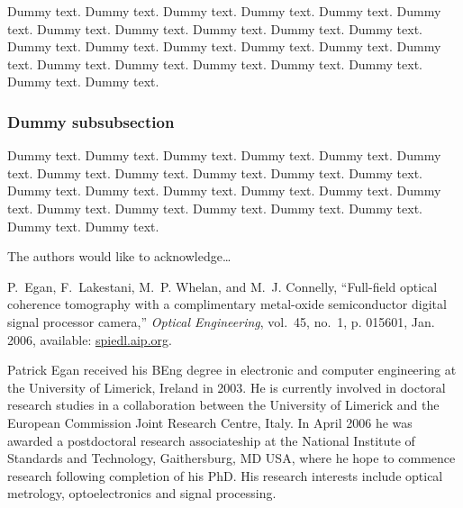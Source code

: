 \documentclass[10pt,letterpaper,optenglett,fleqn]{article}      %
\begin{document}
Dummy text. Dummy text. Dummy text. Dummy text. Dummy text. Dummy
text. Dummy text. Dummy text. Dummy text. Dummy text. Dummy text.
Dummy text. Dummy text. Dummy text. Dummy text. Dummy text. Dummy
text. Dummy text. Dummy text. Dummy text. Dummy text. Dummy text.
Dummy text. Dummy text.

\subsubsection{Dummy subsubsection}

Dummy text. Dummy text. Dummy text. Dummy text. Dummy text. Dummy
text. Dummy text. Dummy text. Dummy text. Dummy text. Dummy text.
Dummy text. Dummy text. Dummy text. Dummy text. Dummy text. Dummy
text. Dummy text. Dummy text. Dummy text. Dummy text. Dummy text.
Dummy text. Dummy text.





The authors would like to acknowledge\ldots



%
%

\begin{thebibliography}{99}

P.~{Egan}, F.~{Lakestani}, M.~P. {Whelan}, and M.~J. {Connelly},
``Full-field optical coherence tomography with a complimentary
  metal-oxide semiconductor digital signal processor camera,'' \emph{Optical
  Engineering}, vol.~45, no.~1, p. 015601, Jan. 2006, available:
  \href{http://dx.doi.org/10.1117/1.2158968}{spiedl.aip.org}.

\end{thebibliography}




\begin{biography}[fig_1]{Patrick Egan}
received his BEng degree in electronic and computer engineering at
the University of Limerick, Ireland in 2003. He is currently
involved in doctoral research studies in a collaboration between the
University of Limerick and the European Commission Joint Research
Centre, Italy. In April 2006 he was awarded a postdoctoral research
associateship at the National Institute of Standards and Technology,
Gaithersburg, MD USA, where he hope to commence research following
completion of his PhD. His research interests include optical
metrology, optoelectronics and signal processing.
\end{biography}
\end{document}
